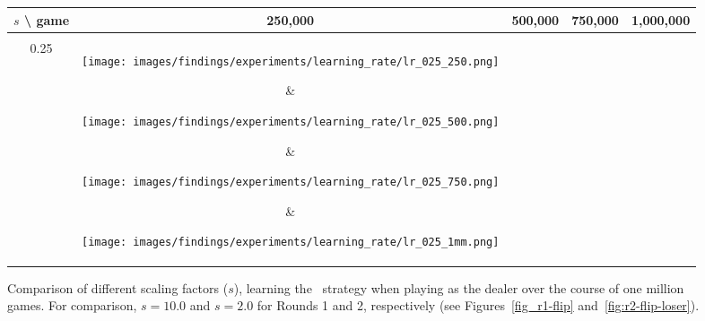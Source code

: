 \begin{figure}[h]
	\centering

	\begin{tabular}{c | c c c c}
		$s$ \textbf{\textbackslash} game & 250,000 & 500,000 & 750,000 & 1,000,000 \\
		\hline
		\\
		0.25 & %
			\parbox[c]{5em}{\texttt{[image: images/findings/experiments/learning\_rate/lr\_025\_250.png]}} & %
			\parbox[c]{5em}{\texttt{[image: images/findings/experiments/learning\_rate/lr\_025\_500.png]}} & %
			\parbox[c]{5em}{\texttt{[image: images/findings/experiments/learning\_rate/lr\_025\_750.png]}} & %
			\parbox[c]{5em}{\texttt{[image: images/findings/experiments/learning\_rate/lr\_025\_1mm.png]}} \\ %
		\\
		0.50 & 
			\parbox[c]{5em}{\texttt{[image: images/findings/experiments/learning\_rate/lr\_050\_250.png]}} & %
			\parbox[c]{5em}{\texttt{[image: images/findings/experiments/learning\_rate/lr\_050\_500.png]}} & %
			\parbox[c]{5em}{\texttt{[image: images/findings/experiments/learning\_rate/lr\_050\_750.png]}} & %
			\parbox[c]{5em}{\texttt{[image: images/findings/experiments/learning\_rate/lr\_050\_1mm.png]}} \\ %
		\\
		0.75 & 
			\parbox[c]{5em}{\texttt{[image: images/findings/experiments/learning\_rate/lr\_075\_250.png]}} & %
			\parbox[c]{5em}{\texttt{[image: images/findings/experiments/learning\_rate/lr\_075\_500.png]}} & %
			\parbox[c]{5em}{\texttt{[image: images/findings/experiments/learning\_rate/lr\_075\_750.png]}} & %
			\parbox[c]{5em}{\texttt{[image: images/findings/experiments/learning\_rate/lr\_075\_1mm.png]}} \\ %
		\\
		1.50 & 
			\parbox[c]{5em}{\texttt{[image: images/findings/experiments/learning\_rate/lr\_150\_250.png]}} & %
			\parbox[c]{5em}{\texttt{[image: images/findings/experiments/learning\_rate/lr\_150\_500.png]}} & %
			\parbox[c]{5em}{\texttt{[image: images/findings/experiments/learning\_rate/lr\_150\_750.png]}} & %
			\parbox[c]{5em}{\texttt{[image: images/findings/experiments/learning\_rate/lr\_150\_1mm.png]}} \\ %
	\end{tabular}

\caption{
	Comparison of different scaling factors ($s$),
	learning the \handmaxavg\ strategy
	when playing as the dealer
	over the course of one million games.
	For comparison, $s = 10.0$ and $s = 2.0$ for Rounds 1 and 2, respectively
	(see Figures~\ref{fig_r1-flip} and~\ref{fig:r2-flip-loser}).
	}
\label{fig:expts-lr-comp}
\end{figure}

